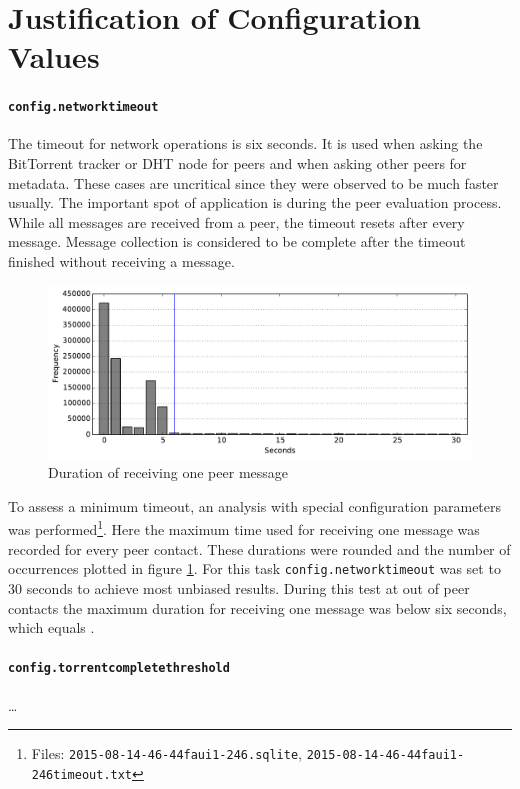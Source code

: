 \documentclass[10pt, a4paper, twoside, headsepline]{scrbook}
\renewcommand{\_}{\origunderscore\allowbreak}
\newcommand{\config}[1]{\texttt{config.\allowbreak #1}}
\begin{document}
\section{Justification of Configuration Values}
\paragraph{\config{network\_timeout}}
The timeout for network operations is six seconds. It is used when asking the BitTorrent tracker or DHT node for peers and when asking other peers for metadata. These cases are uncritical since they were observed to be much faster usually. The important spot of application is during the peer evaluation process. While all messages are received from a peer, the timeout resets after every message. Message collection is considered to be complete after the timeout finished without receiving a message.

\begin{figure}
\centering
\includegraphics[width=\textwidth]{graphics/2015-08-14_17-46-44_faui1-246_timeout}
\caption{Duration of receiving one peer message}
\label{timeout-calibration}
\end{figure}

To assess a minimum timeout, an analysis with special configuration parameters was performed\footnote{Files: \texttt{2015-08-14\_17-46-44\_faui1-246.sqlite}, \texttt{2015-08-14\_17-46-44\_faui1-246\_timeout.txt}}. Here the maximum time used for receiving one message was recorded for every peer contact. These durations were rounded and the number of occurrences plotted in figure \ref{timeout-calibration}. For this task \config{network\_timeout} was set to 30 seconds to achieve most unbiased results. During this test at  out of  peer contacts the maximum duration for receiving one message was below six seconds, which equals .

\paragraph{\config{torrent\_complete\_threshold}}
\dots
\end{document}
